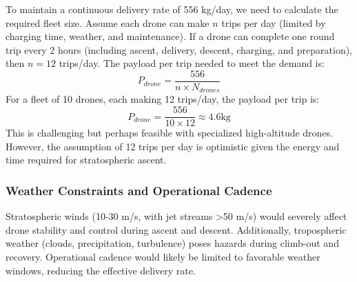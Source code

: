 To maintain a continuous delivery rate of 556 kg/day, we need to calculate the required fleet size. Assume each drone can make $n$ trips per day (limited by charging time, weather, and maintenance). If a drone can complete one round trip every 2 hours (including ascent, delivery, descent, charging, and preparation), then $n = 12$ trips/day. The payload per trip needed to meet the demand is:
\begin{equation}
P_{drone} = \frac{556}{n \times N_{drones}}
\end{equation}
For a fleet of 10 drones, each making 12 trips/day, the payload per trip is:
\begin{equation}
P_{drone} = \frac{556}{10 \times 12} \approx 4.6  \text{kg}
\end{equation}
This is challenging but perhaps feasible with specialized high-altitude drones. However, the assumption of 12 trips per day is optimistic given the energy and time required for stratospheric ascent.

\subsubsection{Weather Constraints and Operational Cadence}
Stratospheric winds (10-30 m/s, with jet streams >50 m/s) would severely affect drone stability and control during ascent and descent. Additionally, tropospheric weather (clouds, precipitation, turbulence) poses hazards during climb-out and recovery. Operational cadence would likely be limited to favorable weather windows, reducing the effective delivery rate.

